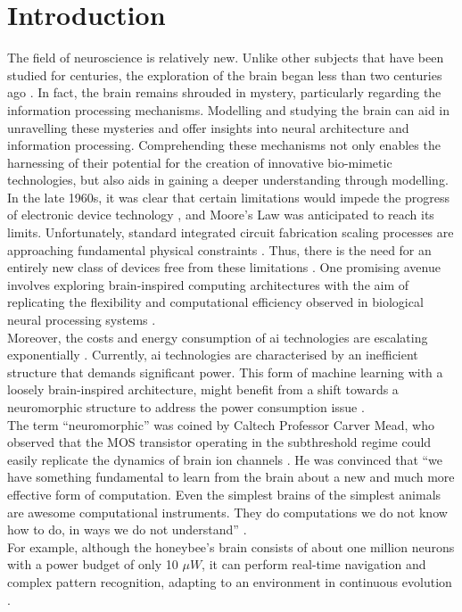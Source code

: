 \chapter{Introduction}

The field of neuroscience is relatively new. Unlike other subjects that
have been studied for centuries, the exploration of the brain began less
than two centuries ago \cite{Ghosh}. In fact, the brain
remains shrouded in mystery, particularly regarding the information
processing mechanisms. Modelling and studying the brain can aid in
unravelling these mysteries and offer insights into neural architecture and
information processing. Comprehending these mechanisms not only enables the
harnessing of their potential for the creation of innovative bio-mimetic
technologies, but also aids in gaining a deeper understanding through
modelling.\\

In the late 1960s, it was clear that certain limitations 
would impede the progress of electronic device technology 
\cite{Hoeneisen}, and Moore's Law \cite{Moore}
was anticipated to reach its limits. Unfortunately, 
standard integrated circuit fabrication scaling processes 
are approaching fundamental physical constraints \cite{Shalf}. 
Thus, there is the need for an entirely new class of devices free from 
these limitations \cite{Mead1990}. One promising avenue involves 
exploring brain-inspired computing architectures with 
the aim of replicating the flexibility and computational 
efficiency observed in biological neural processing systems 
\cite{Frenkel2023}.\\
Moreover, the costs and energy consumption of \acrfull{ai} technologies are escalating exponentially \cite{DeVries}.
Currently, \acrshort{ai} technologies are characterised by an inefficient 
structure that demands significant power. This form of 
machine learning with a loosely brain-inspired architecture, 
might benefit from a shift towards a neuromorphic structure to 
address the power consumption issue \cite{Mead2023}.\\

The term \enquote{neuromorphic} was coined by Caltech Professor
Carver Mead, who observed that the MOS transistor operating 
in the subthreshold regime could easily replicate the dynamics 
of brain ion channels \cite{Mead1989}. He was convinced that \enquote{we have something fundamental to learn from 
the brain about a new and much more effective form of computation. 
Even the simplest brains of the simplest animals are awesome 
computational instruments. They do computations we do not know 
how to do, in ways we do not understand} \cite{Mead1990}.\\
For example, although the honeybee's brain consists of about 
one million neurons with a power budget of only 10 $\mu W$, it can 
perform real-time navigation and complex pattern recognition,
adapting to an environment in continuous
evolution \cite{Sandin}.\\

